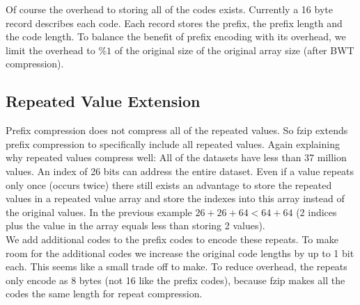 \indent Of course the overhead to storing all of the codes exists. Currently a 16 byte record describes each code. Each record stores the prefix, the prefix length and the code length. To balance the benefit of prefix encoding with its overhead, we limit the overhead to $\%1$ of the original size of the original array size (after BWT compression).
\subsection{Repeated Value Extension}
Prefix compression does not compress all of the repeated values. So fzip extends prefix compression to specifically include all repeated values. Again explaining why repeated values compress well: All of the datasets have less than 37 million values. An index of 26 bits can address the entire dataset. Even if a value repeats only once (occurs twice) there still exists an advantage to store the repeated values in a repeated value array and store the indexes into this array instead of the original values. In the previous example $26+26+64<64+64$ (2 indices plus the value in the array equals less than storing 2 values).\\
\indent We add additional codes to the prefix codes to encode these repeats. To make room for the additional codes we increase the original code lengths by up to 1 bit each. This seems like a small trade off to make. To reduce overhead, the repeats only encode as 8 bytes (not 16 like the prefix codes), because fzip makes all the codes the same length for repeat compression.
